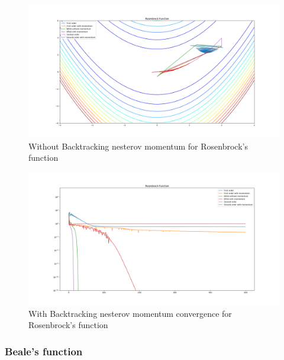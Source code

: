 \documentclass{article}
\begin{document}
\begin{figure}[H]
	\includegraphics[width=\linewidth]{../Images/rosenbrockbacktrack.png}
	\caption{Without Backtracking nesterov momentum for Rosenbrock's function}
	\label{fig:With Backtracking nesterov momentum for Rosenbrock's function}
\end{figure}

\begin{figure}[H]
	\includegraphics[width=\linewidth]{../Images/rosenbrockbacktrack1.png}
	\caption{With Backtracking nesterov momentum convergence for Rosenbrock's function}
	\label{fig:With Backtracking nesterov momentum convergence for Rosenbrock's function}
\end{figure}

\subsubsection{Beale's function}
\end{document}
